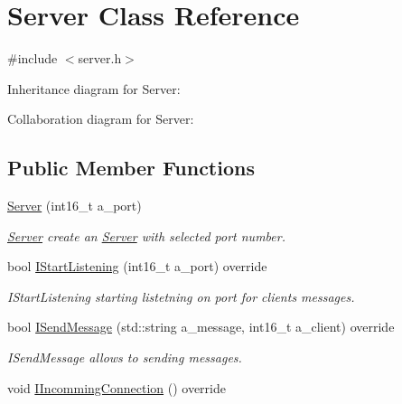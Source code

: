 \hypertarget{classServer}{}\section{Server Class Reference}
\label{classServer}


{\ttfamily \#include $<$server.\+h$>$}



Inheritance diagram for Server\+:


Collaboration diagram for Server\+:
\subsection*{Public Member Functions}
\begin{DoxyCompactItemize}
\item 
\hyperlink{classServer_aa8e412812671a005a6c530f8510db931}{Server} (int16\+\_\+t a\+\_\+port)
\begin{DoxyCompactList}\small\item\em \hyperlink{classServer}{Server} create an \hyperlink{classServer}{Server} with selected port number. \end{DoxyCompactList}\item 
bool \hyperlink{classServer_a15eef69cccd5dba122a76f63b13e1733}{I\+Start\+Listening} (int16\+\_\+t a\+\_\+port) override
\begin{DoxyCompactList}\small\item\em I\+Start\+Listening starting listetning on port for clients messages. \end{DoxyCompactList}\item 
bool \hyperlink{classServer_a7f43c5c286c0a64624a803fcf2f3c85a}{I\+Send\+Message} (std\+::string a\+\_\+message, int16\+\_\+t a\+\_\+client) override
\begin{DoxyCompactList}\small\item\em I\+Send\+Message allows to sending messages. \end{DoxyCompactList}\item 
void \hyperlink{classServer_a404070676bda1e2582cd6b467e73b6a2}{I\+Incomming\+Connection} () override\hypertarget{classServer_a404070676bda1e2582cd6b467e73b6a2}{}\label{classServer_a404070676bda1e2582cd6b467e73b6a2}


\end{DoxyCompactItemize}
